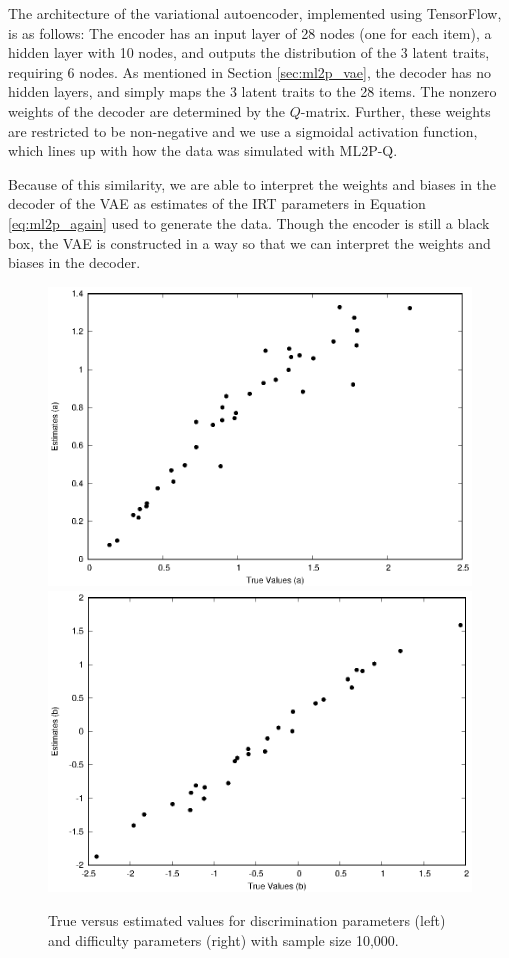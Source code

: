 The architecture of the variational autoencoder, implemented using TensorFlow, is as follows: The encoder has an input layer of 28 nodes (one for each item), a hidden layer with 10 nodes, and outputs the distribution of the 3 latent traits, requiring 6 nodes. As mentioned in Section \ref{sec:ml2p_vae}, the decoder has no hidden layers, and simply maps the 3 latent traits to the 28 items. The nonzero weights of the decoder are determined by the $Q$-matrix. Further, these weights are restricted to be non-negative and we use a sigmoidal activation function, which lines up with how the data was simulated with ML2P-Q. 

Because of this similarity, we are able to interpret the weights and biases in the decoder of the VAE as estimates of the IRT parameters in Equation \ref{eq:ml2p_again} used to generate the data. Though the encoder is still a black box, the VAE is constructed in a way so that we can interpret the weights and biases in the decoder.

\begin{figure}[h]
  \centering
{}
\includegraphics[width=\textwidth]{img/ijcnn_results/10k_a.eps}
   \endminipage\hfill
 \includegraphics[width=\textwidth]{img/ijcnn_results/10k_b.eps}
   \endminipage\hfill
   \caption{True versus estimated values for discrimination parameters (left) and difficulty parameters (right) with sample size 10,000.}
  \label{fig:a_b_10k}
\end{figure}

